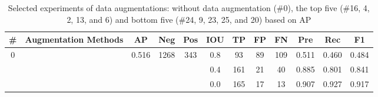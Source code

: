 \documentclass[preprint,12pt,authoryear]{elsarticle}
\begin{document}
\begin{table}
\footnotesize
\caption{Selected experiments of data augmentations: without data augmentation (\#0), the top five (\#16, 4, 2, 13, and 6) and bottom five (\#24, 9, 23, 25, and 20) based on AP}
\label{table_acc_imgaug}
\begin{tabular}{c >{\centering\arraybackslash}m{2.2cm} c c  c ccc c c c c}
\toprule
\textbf{\#}&\textbf{Augmentation Methods}&\textbf{AP}&\textbf{Neg}&\textbf{Pos}&\textbf{IOU}&\textbf{TP}&\textbf{FP}&\textbf{FN}&\textbf{Pre}&\textbf{Rec}&\textbf{F1} \\
\midrule

\multirow{3}{*}{0} &  \multirow{3}{*}{} & \multirow{3}{*}{0.516} & \multirow{3}{*}{1268} & \multirow{3}{*}{343} &0.8 & 93	&89	&109&	0.511 &	0.460& 	0.484  \\
 &  & &  &   & 0.4 & 161&	21	&40	&0.885 &	0.801 &	0.841  \\
 &  & &  &   & 0.0 & 165&	17	&13&	0.907 	&0.927 	&0.917  \\

\hline
\hline


\end{tabular}
\end{table}
\end{document}
